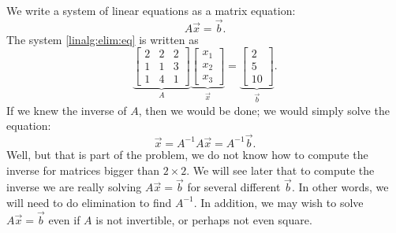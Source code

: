 \documentclass{ximera}
\begin{document}
We write a system of linear equations as a matrix equation:
\begin{equation*}
    A \vec{x} = \vec{b} .
\end{equation*}
The system \eqref{linalg:elim:eq} is written as
\begin{equation*}
    \underbrace{
    \begin{bmatrix}
        2 & 2 & 2 \\
        1 & 1 & 3 \\
        1 & 4 & 1 
    \end{bmatrix}
    }_{A} \underbrace{
    \begin{bmatrix}
        x_1 \\
        x_2 \\
        x_3
    \end{bmatrix} 
    }_{\vec{x}} = \underbrace{
    \begin{bmatrix}
        2 \\
        5 \\
        10
    \end{bmatrix}
    }_{\vec{b}} .
\end{equation*}
If we knew the inverse of $A$, then we would be done; we would simply solve the equation:
\begin{equation*}
    \vec{x} = A^{-1} A \vec{x} = A^{-1} \vec{b} .
\end{equation*}
Well, but that is part of the problem, we do not know how to compute the inverse for matrices bigger than $2 \times 2$. We will see later that to compute the inverse we are really solving $A \vec{x} = \vec{b}$ for several different $\vec{b}$.  In other words, we will need to do elimination to find $A^{-1}$. In addition, we may wish to solve $A \vec{x} = \vec{b}$ even if $A$ is not invertible, or perhaps not even square.
\end{document}
